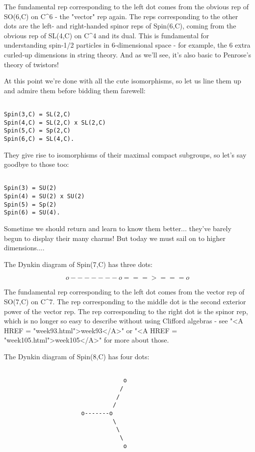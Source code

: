 The fundamental rep corresponding to the left dot comes from the 
obvious rep of SO(6,C) on C^{6} - the "vector" rep again.  
The reps corresponding to the other dots are the left- and right-handed
spinor reps of Spin(6,C), coming from the obvious rep of SL(4,C)
on C^{4} and its dual.  This is fundamental for understanding
spin-1/2 particles in 6-dimensional space - for example, the 6 extra
curled-up dimensions in string theory.  And as we'll see, it's also
basic to Penrose's theory of twistors!


At this point we're done with all the cute isomorphisms, so let us line
them up and admire them before bidding them farewell:


\begin{verbatim}

Spin(3,C) = SL(2,C)
Spin(4,C) = SL(2,C) x SL(2,C)
Spin(5,C) = Sp(2,C)
Spin(6,C) = SL(4,C).
\end{verbatim}
    
They give rise to isomorphisms of their maximal compact subgroups, 
so let's say goodbye to those too:


\begin{verbatim}

Spin(3) = SU(2)
Spin(4) = SU(2) x SU(2)
Spin(5) = Sp(2)
Spin(6) = SU(4).
\end{verbatim}
    
Sometime we should return and learn to know them better... they've
barely begun to display their many charms!  But today we must 
sail on to higher dimensions....

The Dynkin diagram of Spin(7,C) has three dots:



$$

                     o-------o===>===o 
$$
    
The fundamental rep corresponding to the left dot comes from
the vector rep of SO(7,C) on C^{7}.  The rep corresponding to the
middle dot is the second exterior power of the vector rep.  The
rep corresponding to the right dot is the spinor rep, which is
no longer so easy to describe without using Clifford algebras -
see "<A HREF = "week93.html">week93</A>" or "<A HREF = "week105.html">week105</A>" for more about those.

The Dynkin diagram of Spin(8,C) has four dots:


\begin{verbatim}

                                  o
                                 /
                                /
                               /
                      o-------o
                               \
                                \
                                 \
                                  o
\end{verbatim}
    
